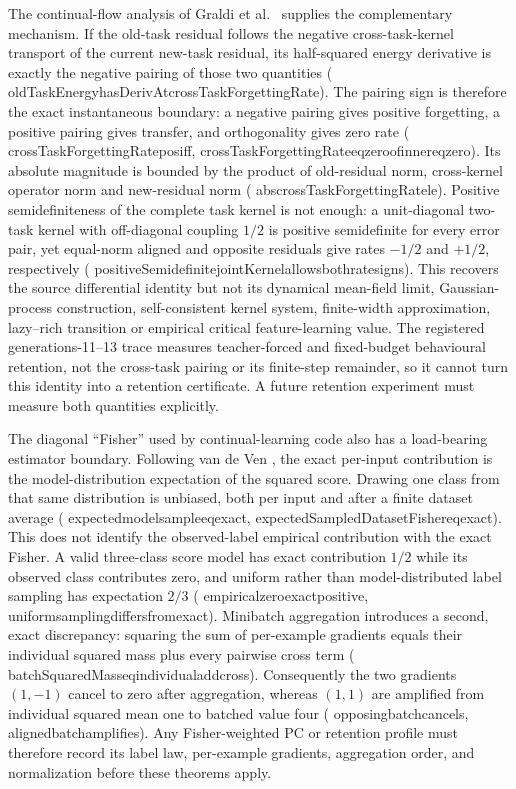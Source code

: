 \documentclass[11pt]{article}
\newcommand{\leanname}[1]{{\scriptsize\ttfamily
  \def\_{\textunderscore\allowbreak}#1}}
\begin{document}
The continual-flow analysis of Graldi et al.\
\cite{graldi2025lazy} supplies the complementary mechanism.  If the old-task
residual follows the negative cross-task-kernel transport of the current
new-task residual, its half-squared energy derivative is exactly the negative
pairing of those two quantities
(\leanname{oldTaskEnergy\_hasDerivAt\_crossTaskForgettingRate}).
The pairing sign is therefore the exact instantaneous boundary: a negative
pairing gives positive forgetting, a positive pairing gives transfer, and
orthogonality gives zero rate
(\leanname{crossTaskForgettingRate\_pos\_iff},
\leanname{crossTaskForgettingRate\_eq\_zero\_of\_inner\_eq\_zero}).
Its absolute magnitude is bounded by the product of old-residual norm,
cross-kernel operator norm and new-residual norm
(\leanname{abs\_crossTaskForgettingRate\_le}).
Positive semidefiniteness of the complete task kernel is not enough: a
unit-diagonal two-task kernel with off-diagonal coupling $1/2$ is
positive semidefinite for every error pair, yet equal-norm aligned and
opposite residuals give rates $-1/2$ and $+1/2$, respectively
(\leanname{positiveSemidefinite\_jointKernel\_allows\_both\_rate\_signs}).
This recovers the source differential identity but not its dynamical
mean-field limit, Gaussian-process construction, self-consistent kernel
system, finite-width approximation, lazy--rich transition or empirical
critical feature-learning value.  The registered generations-11--13 trace
measures teacher-forced and fixed-budget behavioural retention, not the
cross-task pairing or its finite-step remainder, so it cannot turn this
identity into a retention certificate.  A future retention experiment must
measure both quantities explicitly.

The diagonal ``Fisher'' used by continual-learning code also has a
load-bearing estimator boundary.  Following van de Ven
\cite{vandeven2025fisher}, the exact per-input contribution is the
model-distribution expectation of the squared score.  Drawing one class from
that same distribution is unbiased, both per input and after a finite dataset
average
(\leanname{expected\_model\_sample\_eq\_exact},
\leanname{expectedSampledDatasetFisher\_eq\_exact}).  This does not identify
the observed-label empirical contribution with the exact Fisher.  A valid
three-class score model has exact contribution $1/2$ while its observed class
contributes zero, and uniform rather than model-distributed label sampling
has expectation $2/3$
(\leanname{empirical\_zero\_exact\_positive},
\leanname{uniform\_sampling\_differs\_from\_exact}).
Minibatch aggregation introduces a second, exact discrepancy: squaring the
sum of per-example gradients equals their individual squared mass plus every
pairwise cross term
(\leanname{batchSquaredMass\_eq\_individual\_add\_cross}).  Consequently the
two gradients $(1,-1)$ cancel to zero after aggregation, whereas $(1,1)$ are
amplified from individual squared mean one to batched value four
(\leanname{opposing\_batch\_cancels},
\leanname{aligned\_batch\_amplifies}).  Any Fisher-weighted PC or
retention profile must therefore record its label law, per-example gradients,
aggregation order, and normalization before these theorems apply.
\end{document}
